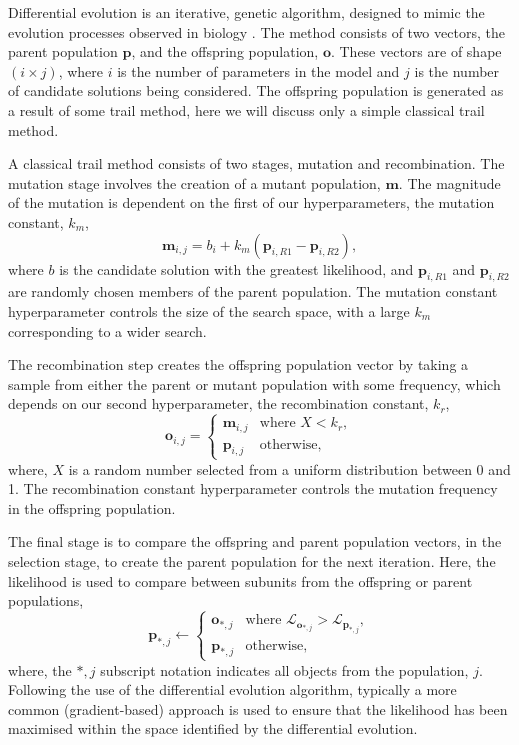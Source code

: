 \documentclass[
 reprint,
 superscriptaddress,
 amsmath,amssymb,
 aps,
]{revtex4-1}
\begin{document}
Differential evolution is an iterative, genetic algorithm, designed to mimic the evolution processes observed in biology \cite{holland_adaptation_1992}.
The method consists of two vectors, the parent population $\mathbf{p}$, and the offspring population, $\mathbf{o}$. 
These vectors are of shape $(i \times j)$, where $i$ is the number of parameters in the model and $j$ is the number of candidate solutions being considered. 
The offspring population is generated as a result of some trail method, here we will discuss only a simple classical trail method.

A classical trail method consists of two stages, mutation and recombination. 
The mutation stage involves the creation of a mutant population, $\mathbf{m}$. 
The magnitude of the mutation is dependent on the first of our hyperparameters, the mutation constant, $k_m$, 
%
\begin{equation}
    \mathbf{m}_{i,j} = b_i + k_m (\mathbf{p}_{i, R1} - \mathbf{p}_{i, R2}),
\end{equation}
%
where $b$ is the candidate solution with the greatest likelihood, and $\mathbf{p}_{i, R1}$ and $\mathbf{p}_{i, R2}$ are randomly chosen members of the parent population. 
The mutation constant hyperparameter controls the size of the search space, with a large $k_m$ corresponding to a wider search. 

The recombination step creates the offspring population vector by taking a sample from either the parent or mutant population with some frequency, which depends on our second hyperparameter, the recombination constant, $k_r$,
%
\begin{equation}
    \mathbf{o}_{i, j} = 
    \begin{cases}
        \mathbf{m}_{i, j} & \text{where } X < k_r,\\
        \mathbf{p}_{i, j} & \text{otherwise},
    \end{cases}
\end{equation}
%
where, $X$ is a random number selected from a uniform distribution between 0 and 1. 
The recombination constant hyperparameter controls the mutation frequency in the offspring population. 

The final stage is to compare the offspring and parent population vectors, in the selection stage, to create the parent population for the next iteration. 
Here, the likelihood is used to compare between subunits from the offspring or parent populations, 
%
\begin{equation}
    \mathbf{p}_{*, j} \leftarrow 
    \begin{cases}
        \mathbf{o}_{*, j} & \text{where } \mathcal{L}_{\mathbf{o}_{*, j}} > \mathcal{L}_{\mathbf{p}_{*, j}},\\
        \mathbf{p}_{*, j} & \text{otherwise},
    \end{cases}
\end{equation}
%
where, the $*, j$ subscript notation indicates all objects from the population, $j$.
Following the use of the differential evolution algorithm, typically a more common (gradient-based) approach is used to ensure that the likelihood has been maximised within the space identified by the differential evolution.
\end{document}
